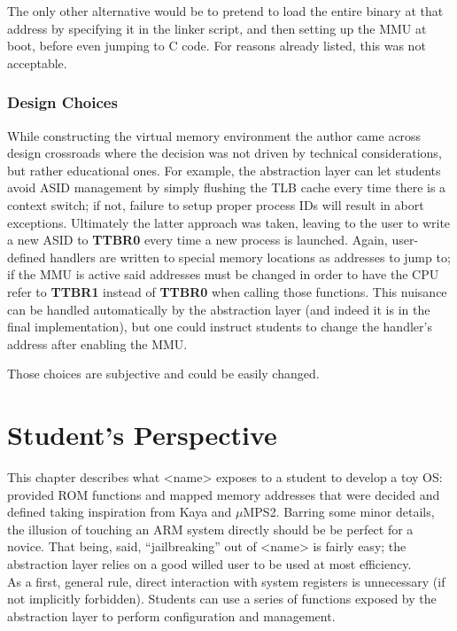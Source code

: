 \documentclass[12pt,a4paper,openright,twoside]{report}
\begin{document}
The only other alternative would be to pretend to load the entire binary at that
address by specifying it in the linker script, and then setting up the MMU at 
boot, before even jumping to C code. For reasons already listed, this was not
acceptable.

\subsection{Design Choices}
While constructing the virtual memory environment the author came across design 
crossroads where the decision was not driven by technical considerations, but
rather educational ones.
For example, the abstraction layer can let students avoid ASID management by 
simply flushing the TLB cache every time there is a context switch; if not,
failure to setup proper process IDs will result in abort exceptions. Ultimately 
the latter approach was taken, leaving to the user to write a new ASID to 
\textbf{TTBR0} every time a new process is launched.
Again, user-defined handlers are written to special memory locations as addresses
to jump to; if the MMU is active said addresses must be changed in order to 
have the CPU refer to \textbf{TTBR1} instead of \textbf{TTBR0} when calling those
functions. This nuisance can be handled automatically by the abstraction layer
(and indeed it is in the final implementation), but one could instruct students
to change the handler's address after enabling the MMU.

Those choices are subjective and could be easily changed.

\clearpage{\pagestyle{empty}\cleardoublepage}
\chapter{Student's Perspective}
This chapter describes what <name> exposes to a student to develop a toy OS:
provided ROM functions and mapped memory addresses that were decided and defined
taking inspiration from Kaya and $\mu$MPS2.
Barring some minor details, the illusion of touching an ARM system directly should
be be perfect for a novice. That being, said, ``jailbreaking'' out of <name> is 
fairly easy; the abstraction layer relies on a good willed user to be used at 
most efficiency.\\
As a first, general rule, direct interaction with system registers is
unnecessary (if not implicitly forbidden). Students can use a series of functions
exposed by the abstraction layer to perform configuration and management.
\end{document}
